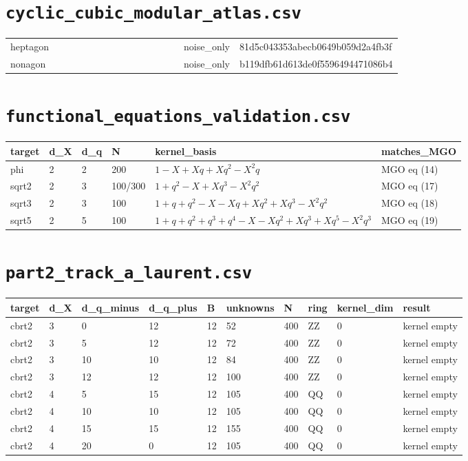 \documentclass[10pt]{article}
\begin{document}
\section*{\texttt{cyclic\_cubic\_modular\_atlas.csv}}
{\footnotesize
\begin{longtable}{@{}llllllllllllllll@{}}
\toprule
\midrule\endhead
heptagon &  &  &  &  &  &  &  &  &  &  &  &  &  & noise\_only & 81d5c043353abecb0649b059d2a4fb3f \\
nonagon &  &  &  &  &  &  &  &  &  &  &  &  &  & noise\_only & b119dfb61d613de0f5596494471086b4 \\
\bottomrule
\end{longtable}}


\section*{\texttt{functional\_equations\_validation.csv}}
{\footnotesize
\begin{longtable}{@{}llllll@{}}
\toprule
\textbf{target} & \textbf{d\_X} & \textbf{d\_q} & \textbf{N} & \textbf{kernel\_basis} & \textbf{matches\_MGO} \\
\midrule\endhead
phi & 2 & 2 & 200 & $1 - X + X q + X q^{2} - X^{2} q$ & MGO eq (14) \\
sqrt2 & 2 & 3 & 100/300 & $1 + q^{2} - X + X q^{3} - X^{2} q^{2}$ & MGO eq (17) \\
sqrt3 & 2 & 3 & 100 & $1 + q + q^{2} - X - X q + X q^{2} + X q^{3} - X^{2} q^{2}$ & MGO eq (18) \\
sqrt5 & 2 & 5 & 100 & $1 + q + q^{2} + q^{3} + q^{4} - X - X q^{2} + X q^{3} + X q^{5} - X^{2} q^{3}$ & MGO eq (19) \\
\bottomrule
\end{longtable}}


\section*{\texttt{part2\_track\_a\_laurent.csv}}
{\footnotesize
\begin{longtable}{@{}llllllllll@{}}
\toprule
\textbf{target} & \textbf{d\_X} & \textbf{d\_q\_minus} & \textbf{d\_q\_plus} & \textbf{B} & \textbf{unknowns} & \textbf{N} & \textbf{ring} & \textbf{kernel\_dim} & \textbf{result} \\
\midrule\endhead
cbrt2 & 3 & 0 & 12 & 12 & 52 & 400 & ZZ & 0 & kernel empty \\
cbrt2 & 3 & 5 & 12 & 12 & 72 & 400 & ZZ & 0 & kernel empty \\
cbrt2 & 3 & 10 & 10 & 12 & 84 & 400 & ZZ & 0 & kernel empty \\
cbrt2 & 3 & 12 & 12 & 12 & 100 & 400 & ZZ & 0 & kernel empty \\
cbrt2 & 4 & 5 & 15 & 12 & 105 & 400 & QQ & 0 & kernel empty \\
cbrt2 & 4 & 10 & 10 & 12 & 105 & 400 & QQ & 0 & kernel empty \\
cbrt2 & 4 & 15 & 15 & 12 & 155 & 400 & QQ & 0 & kernel empty \\
cbrt2 & 4 & 20 & 0 & 12 & 105 & 400 & QQ & 0 & kernel empty \\
\bottomrule
\end{longtable}}
\end{document}
